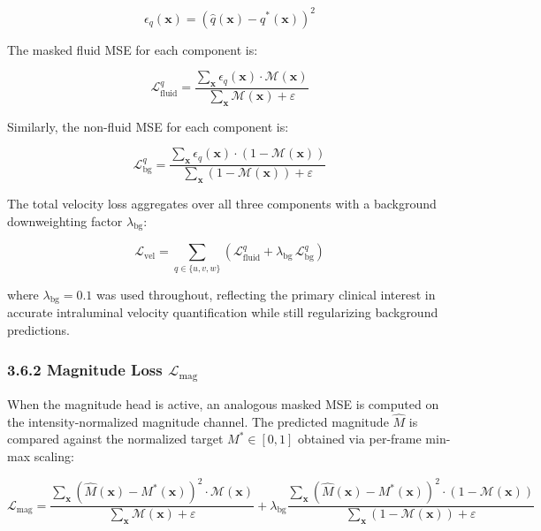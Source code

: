 \documentclass[11pt]{article}
\begin{document}
\begin{equation}
    \epsilon_q(\mathbf{x}) = \left(\hat{q}(\mathbf{x}) - q^*(\mathbf{x})\right)^2
\end{equation}

The masked fluid MSE for each component is:

\begin{equation}
    \mathcal{L}^q_{\text{fluid}} = \frac{\sum_{\mathbf{x}} \epsilon_q(\mathbf{x}) \cdot \mathcal{M}(\mathbf{x})}{\sum_{\mathbf{x}} \mathcal{M}(\mathbf{x}) + \varepsilon}
\end{equation}

Similarly, the non-fluid MSE for each component is:

\begin{equation}
    \mathcal{L}^q_{\text{bg}} = \frac{\sum_{\mathbf{x}} \epsilon_q(\mathbf{x}) \cdot (1 - \mathcal{M}(\mathbf{x}))}{\sum_{\mathbf{x}} (1 - \mathcal{M}(\mathbf{x})) + \varepsilon}
\end{equation}

The total velocity loss aggregates over all three components with a background downweighting factor $\lambda_{\text{bg}}$:

\begin{equation}
    \mathcal{L}_{\text{vel}} = \sum_{q \in \{u,v,w\}} \left( \mathcal{L}^q_{\text{fluid}} + \lambda_{\text{bg}} \, \mathcal{L}^q_{\text{bg}} \right)
\end{equation}

where $\lambda_{\text{bg}} = 0.1$ was used throughout, reflecting the primary clinical interest in accurate intraluminal velocity quantification while still regularizing background predictions.

\subsubsection*{3.6.2 Magnitude Loss $\mathcal{L}_{\text{mag}}$}

When the magnitude head is active, an analogous masked MSE is computed on the intensity-normalized magnitude channel. The predicted magnitude $\hat{M}$ is compared against the normalized target $M^* \in [0, 1]$ obtained via per-frame min-max scaling:

\begin{equation}
    \mathcal{L}_{\text{mag}} =
        \frac{\sum_{\mathbf{x}} \left(\hat{M}(\mathbf{x}) - M^*(\mathbf{x})\right)^2 \cdot \mathcal{M}(\mathbf{x})}{\sum_{\mathbf{x}} \mathcal{M}(\mathbf{x}) + \varepsilon}
        + \lambda_{\text{bg}}
        \frac{\sum_{\mathbf{x}} \left(\hat{M}(\mathbf{x}) - M^*(\mathbf{x})\right)^2 \cdot (1-\mathcal{M}(\mathbf{x}))}{\sum_{\mathbf{x}} (1-\mathcal{M}(\mathbf{x})) + \varepsilon}
\end{equation}
\end{document}
